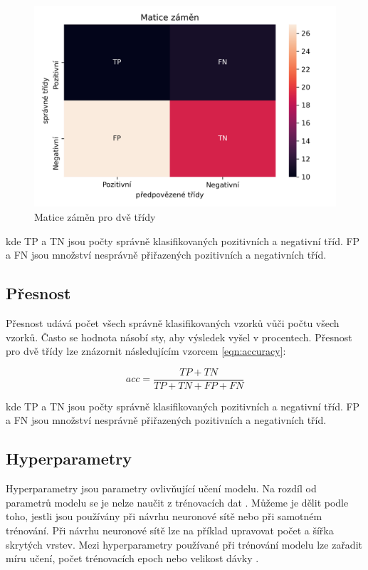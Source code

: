 \documentclass[FM,BP]{tulthesis}
\begin{document}
\begin{figure}[h]
\centerline{\includegraphics[scale=.7]{conf_matrix-example.png}}
\caption{Matice záměn pro dvě třídy}
\label{fig:conf_matrix-example}
\end{figure}
\FloatBarrier

kde TP a TN jsou počty správně klasifikovaných pozitivních a negativní tříd. FP a FN jsou množství nesprávně přiřazených pozitivních a negativních tříd.

\subsection{Přesnost}
Přesnost udává počet všech správně klasifikovaných vzorků vůči počtu všech vzorků. Často se hodnota násobí sty, aby výsledek vyšel v procentech. Přesnost pro dvě třídy lze znázornit následujícím vzorcem \ref{eqn:accuracy}:

\begin{equation}
\label{eqn:accuracy}
acc = \frac{TP + TN}{TP + TN + FP + FN}
\end{equation}

kde TP a TN jsou počty správně klasifikovaných pozitivních a negativní tříd. FP a FN jsou množství nesprávně přiřazených pozitivních a negativních tříd. 

\subsection{Hyperparametry}
Hyperparametry jsou parametry ovlivňující učení modelu. Na rozdíl od parametrů modelu se je nelze naučit z trénovacích dat \cite{geron2019hands}. Můžeme je dělit podle toho, jestli jsou používány při návrhu neuronové sítě nebo při samotném trénování. Při návrhu neuronové sítě lze na příklad upravovat počet a šířka skrytých vrstev. Mezi hyperparametry používané při trénování modelu lze zařadit míru učení, počet trénovacích epoch nebo velikost dávky \cite{dagli_2021}.
\end{document}
